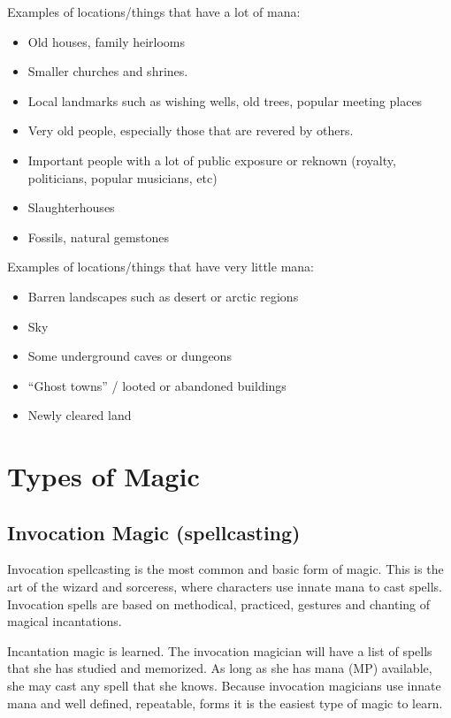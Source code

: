 Examples of locations/things that have a lot of mana:
\begin{itemize}
\item Old houses, family heirlooms
\item Smaller churches and shrines.
\item Local landmarks such as wishing wells, old trees, popular meeting places
\item Very old people, especially those that are revered by others.
\item Important people with a lot of public exposure or reknown
  (royalty, politicians, popular musicians, etc)
\item Slaughterhouses
\item Fossils, natural gemstones
\end{itemize}

Examples of locations/things that have very little mana:
\begin{itemize}
\item Barren landscapes such as desert or arctic regions
\item Sky
\item Some underground caves or dungeons
\item ``Ghost towns'' / looted or abandoned buildings
\item Newly cleared land
\end{itemize}

\section{Types of Magic}

\subsection{Invocation Magic (spellcasting)}

Invocation spellcasting is the most common and basic form of magic.
This is the art of the wizard and sorceress, where characters use
innate mana to cast spells.  Invocation spells are based on
methodical, practiced, gestures and chanting of magical incantations.

Incantation magic is learned.  The invocation magician will have a
list of spells that she has studied and memorized.  As long as she has
mana (MP) available, she may cast any spell that she knows.  Because
invocation magicians use innate mana and well defined, repeatable,
forms it is the easiest type of magic to learn.

